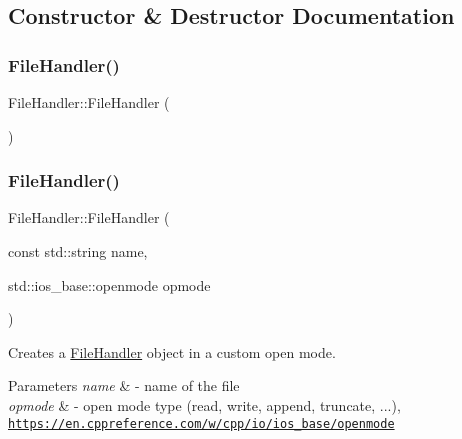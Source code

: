 \subsection{Constructor \& Destructor Documentation}
\mbox{\label{classFileHandler_a07661bacc2ad3e391e9a57a9080dc354}} 
\subsubsection{\texorpdfstring{File\+Handler()}{FileHandler()}\hspace{0.1cm}{\footnotesize\ttfamily [1/3]}}
{\footnotesize\ttfamily File\+Handler\+::\+File\+Handler (\begin{DoxyParamCaption}{ }\end{DoxyParamCaption})\hspace{0.3cm}{\ttfamily [delete]}}

\mbox{\label{classFileHandler_a2d2bdbea8aea3da7ccb7d45a4680d024}} 
\subsubsection{\texorpdfstring{File\+Handler()}{FileHandler()}\hspace{0.1cm}{\footnotesize\ttfamily [2/3]}}
{\footnotesize\ttfamily File\+Handler\+::\+File\+Handler (\begin{DoxyParamCaption}\item[{const std\+::string}]{name,  }\item[{std\+::ios\+\_\+base\+::openmode}]{opmode }\end{DoxyParamCaption})\hspace{0.3cm}{\ttfamily [inline]}}



Creates a \hyperlink{classFileHandler}{File\+Handler} object in a custom open mode. 


\begin{DoxyParams}{Parameters}
{\em name} & -\/ name of the file \\
\hline
{\em opmode} & -\/ open mode type (read, write, append, truncate, ...), \href{https://en.cppreference.com/w/cpp/io/ios_base/openmode}{\tt https\+://en.\+cppreference.\+com/w/cpp/io/ios\+\_\+base/openmode} \\
\hline
\end{DoxyParams}
\mbox{\label{classFileHandler_abe0b1304883922e11676974a15f003df}} 

